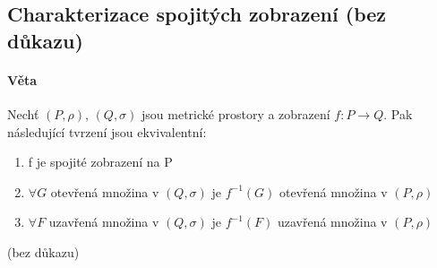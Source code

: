 \documentclass[a4paper,10pt]{article}
\begin{document}
\subsection{Charakterizace spojitých zobrazení (bez důkazu)}
\setcounter{equation}{0}
\paragraph{Věta}
Nechť $(P, \rho)$, $(Q, \sigma)$ jsou metrické prostory a zobrazení $f:P\to Q$.
Pak následující tvrzení jsou ekvivalentní:
\begin{enumerate}
	\item f je spojité zobrazení na P
	\item $\forall G$ otevřená množina v $(Q, \sigma)$ je $f^{-1}(G)$ otevřená
	množina v $(P, \rho)$
	\item $\forall F$ uzavřená množina v $(Q, \sigma)$ je $f^{-1}(F)$ uzavřená
	množina v $(P, \rho)$
\end{enumerate}
(bez důkazu)
\end{document}
